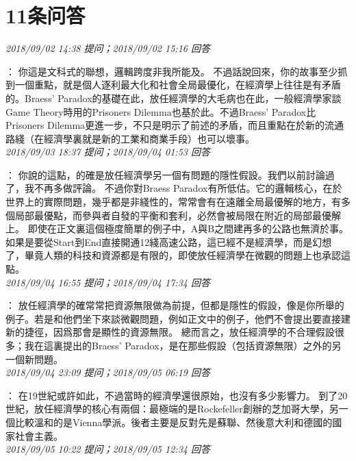 \documentclass[twocolumn]{ctexart}
\begin{document}
\section{11条问答}

\textit{\hfill\noindent\small 2018/09/02 14:38 提问；2018/09/02 15:16 回答}

：
你這是文科式的聯想，邏輯跨度非我所能及。
不過話說回來，你的故事至少抓到一個重點，就是個人逐利最大化和社會全局最優化，在經濟學上往往是有矛盾的。Braess' Paradox的基礎在此，放任經濟學的大毛病也在此，一般經濟學家談Game Theory時用的Prisoners Dilemma也基於此。不過Braess' Paradox比Prisoners Dilemma更進一步，不只是明示了前述的矛盾，而且重點在於新的流通路綫（在經濟學裏就是新的工業和商業手段）也可以壞事。
\\

\textit{\hfill\noindent\small 2018/09/03 18:37 提问；2018/09/04 01:53 回答}

：
你說的這點，的確是放任經濟學另一個有問題的隱性假設。我們以前討論過了，我不再多做評論。
不過你對Braess Paradox有所低估。它的邏輯核心，在於世界上的實際問題，幾乎都是非綫性的，常常會有在遠離全局最優解的地方，有多個局部最優點，而參與者自發的平衡和套利，必然會被局限在附近的局部最優解上。
即使在正文裏這個極度簡單的例子中，A與B之間建再多的公路也無濟於事。如果是要從Start到End直接開通12綫高速公路，這已經不是經濟學，而是幻想了，畢竟人類的科技和資源都是有限的，即使放任經濟學在微觀的問題上也承認這點。
\\

\textit{\hfill\noindent\small 2018/09/04 16:55 提问；2018/09/04 17:34 回答}

：
放任經濟學的確常常把資源無限做為前提，但都是隱性的假設，像是你所舉的例子。若是和他們坐下來談微觀問題，例如正文中的例子，他們不會提出要直接建新的捷徑，因爲那會是顯性的資源無限。
總而言之，放任經濟學的不合理假設很多；我在這裏提出的Braess' Paradox，是在那些假設（包括資源無限）之外的另一個新問題。
\\

\textit{\hfill\noindent\small 2018/09/04 23:09 提问；2018/09/05 06:19 回答}

：
在19世紀或許如此，不過當時的經濟學還很原始，也沒有多少影響力。
到了20世紀，放任經濟學的核心有兩個：最極端的是Rockefeller創辦的芝加哥大學，另一個比較溫和的是Vienna學派。後者主要是反對先是蘇聯、然後意大利和德國的國家社會主義。
\\

\textit{\hfill\noindent\small 2018/09/05 10:22 提问；2018/09/05 12:34 回答}
\end{document}
